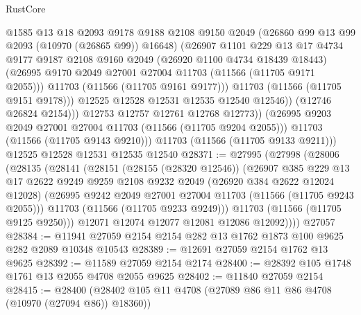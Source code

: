 \begin{lexlean}{RustCore}
\begin{coremodule}
                      @1585
                      @13
                      @18
                      @2093
                      @9178
                      @9188
                      @2108
                      @9150
                      @2049
                      (@26860 @99 @13 @99 @2093 (@10970 (@26865 @99)) @16648)
                      (@26907
                        @1101
                        @229
                        @13
                        @17
                        @4734
                        @9177
                        @9187
                        @2108
                        @9160
                        @2049
                        (@26920 @1100 @4734 @18439 @18443)
                        (@26995 @9170 @2049 @27001 @27004 @11703 (@11566 (@11705 @9171 @2055)))
                        @11703
                        (@11566 (@11705 @9161 @9177)))
                      @11703
                      (@11566 (@11705 @9151 @9178)))
                    @12525
                    @12528
                    @12531
                    @12535
                    @12540
                    @12546))
                (@12746 @26824 @2154)))
            @12753
            @12757
            @12761
            @12768
            @12773))
        (@26995 @9203 @2049 @27001 @27004 @11703 (@11566 (@11705 @9204 @2055)))
        @11703
        (@11566 (@11705 @9143 @9210)))
      @11703
      (@11566 (@11705 @9133 @9211)))
    @12525
    @12528
    @12531
    @12535
    @12540
@28371 := @27995
    (@27998
      (@28006
        (@28135
          (@28141
            (@28151
              (@28155 (@28320 @12546))
              (@26907
                @385
                @229
                @13
                @17
                @2622
                @9249
                @9259
                @2108
                @9232
                @2049
                (@26920 @384 @2622 @12024 @12028)
                (@26995 @9242 @2049 @27001 @27004 @11703 (@11566 (@11705 @9243 @2055)))
                @11703
                (@11566 (@11705 @9233 @9249)))
              @11703
              (@11566 (@11705 @9125 @9250)))
            @12071
            @12074
            @12077
            @12081
            @12086
            @12092))))
    @27057
@28384 := @11941 @27059 @2154 @2154 @282 @13 @1762 @1873 @100 @9625 @282 @2089 @10348 @10543
@28389 := @12691 @27059 @2154 @1762 @13 @9625
@28392 := @11589 @27059 @2154 @2174
@28400 := @28392 @105 @1748 @1761 @13 @2055 @4708 @2055 @9625
@28402 := @11840 @27059 @2154
@28415 := @28400 (@28402 @105 @11 @4708 (@27089 @86 @11 @86 @4708 (@10970 (@27094 @86)) @18360))

\end{coremodule}
\end{lexlean}
